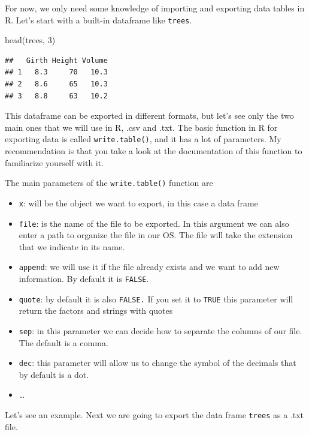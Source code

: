 \documentclass[
]{book}
\newenvironment{Shaded}{\begin{snugshade}}{\end{snugshade}}
\newcommand{\DecValTok}[1]{\textcolor[rgb]{0.00,0.00,0.81}{#1}}
\newcommand{\FunctionTok}[1]{\textcolor[rgb]{0.00,0.00,0.00}{#1}}
\newcommand{\NormalTok}[1]{#1}
\providecommand{\tightlist}{%
  \setlength{\itemsep}{0pt}\setlength{\parskip}{0pt}}
\begin{document}
For now, we only need some knowledge of importing and exporting data tables in R. Let's start with a built-in dataframe like \texttt{trees}.

\begin{Shaded}
\begin{Highlighting}[]
\FunctionTok{head}\NormalTok{(trees, }\DecValTok{3}\NormalTok{)}
\end{Highlighting}
\end{Shaded}

\begin{verbatim}
##   Girth Height Volume
## 1   8.3     70   10.3
## 2   8.6     65   10.3
## 3   8.8     63   10.2
\end{verbatim}

This dataframe can be exported in different formats, but let's see only the two main ones that we will use in R, .csv and .txt. The basic function in R for exporting data is called \texttt{write.table()}, and it has a lot of parameters. My recommendation is that you take a look at the documentation of this function to familiarize yourself with it.

The main parameters of the \texttt{write.table()} function are

\begin{itemize}
\tightlist
\item
  \texttt{x}: will be the object we want to export, in this case a data frame
\item
  \texttt{file}: is the name of the file to be exported. In this argument we can also enter a path to organize the file in our OS. The file will take the extension that we indicate in its name.
\item
  \texttt{append}: we will use it if the file already exists and we want to add new information. By default it is \texttt{FALSE}.
\item
  \texttt{quote}: by default it is also \texttt{FALSE.} If you set it to \texttt{TRUE} this parameter will return the factors and strings with quotes
\item
  \texttt{sep}: in this parameter we can decide how to separate the columns of our file. The default is a comma.
\item
  \texttt{dec}: this parameter will allow us to change the symbol of the decimals that by default is a dot.
\item
  \ldots{}
\end{itemize}

Let's see an example. Next we are going to export the data frame \texttt{trees} as a .txt file.
\end{document}
